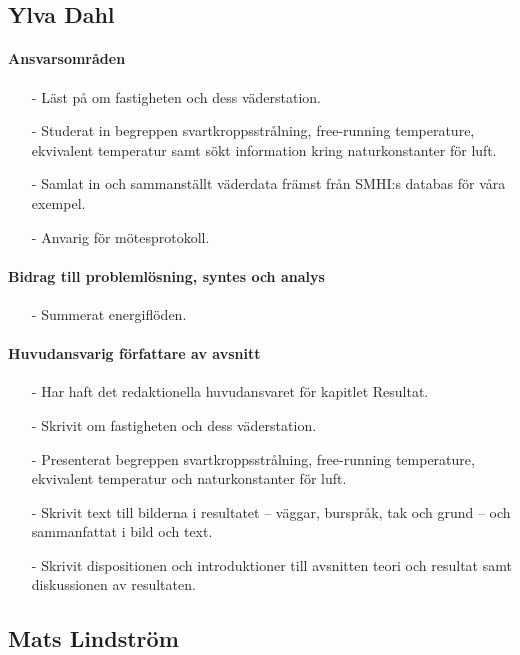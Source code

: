 \documentclass[12pt,a4paper]{article}
\begin{document}
\subsection*{Ylva Dahl}

\paragraph{Ansvarsområden}

\begin{itemize}
\item[-] Läst på om fastigheten och dess väderstation.
\item[-] Studerat in begreppen svartkroppsstrålning, free-running temperature, ekvivalent temperatur samt sökt information kring naturkonstanter för luft.
\item[-] Samlat in och sammanställt väderdata främst från SMHI:s databas för våra exempel.
\item[-] Anvarig för mötesprotokoll.
\end{itemize}

\paragraph{Bidrag till problemlösning, syntes och analys}
\begin{itemize}
\item[-] Summerat energiflöden.
\end{itemize}

\paragraph{Huvudansvarig författare av avsnitt}
\begin{itemize}
\item[-] Har haft det redaktionella huvudansvaret för kapitlet Resultat.
\item[-] Skrivit om fastigheten och dess väderstation.
\item[-] Presenterat begreppen svartkroppsstrålning, free-running temperature, ekvivalent temperatur och naturkonstanter för luft.
\item[-] Skrivit text till bilderna i resultatet – väggar, burspråk, tak och grund – och sammanfattat i bild och text.
\item[-] Skrivit dispositionen och introduktioner till avsnitten teori och resultat samt diskussionen av resultaten.
\end{itemize}


\subsection*{Mats Lindström}
\end{document}
